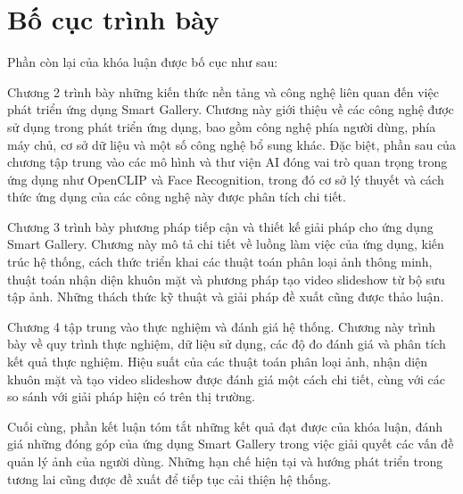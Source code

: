 \section{Bố cục trình bày}

Phần còn lại của khóa luận được bố cục như sau: 

Chương 2 trình bày những kiến thức nền tảng và công nghệ liên quan đến việc phát triển ứng dụng Smart Gallery. Chương này giới thiệu về các công nghệ được sử dụng trong phát triển ứng dụng, bao gồm công nghệ phía người dùng, phía máy chủ, cơ sở dữ liệu và một số công nghệ bổ sung khác. Đặc biệt, phần sau của chương tập trung vào các mô hình và thư viện AI đóng vai trò quan trọng trong ứng dụng như OpenCLIP và Face Recognition, trong đó cơ sở lý thuyết và cách thức ứng dụng của các công nghệ này được phân tích chi tiết.

Chương 3 trình bày phương pháp tiếp cận và thiết kế giải pháp cho ứng dụng Smart Gallery. Chương này mô tả chi tiết về luồng làm việc của ứng dụng, kiến trúc hệ thống, cách thức triển khai các thuật toán phân loại ảnh thông minh, thuật toán nhận diện khuôn mặt và phương pháp tạo video slideshow từ bộ sưu tập ảnh. Những thách thức kỹ thuật và giải pháp đề xuất cũng được thảo luận.

Chương 4 tập trung vào thực nghiệm và đánh giá hệ thống. Chương này trình bày về quy trình thực nghiệm, dữ liệu sử dụng, các độ đo đánh giá và phân tích kết quả thực nghiệm. Hiệu suất của các thuật toán phân loại ảnh, nhận diện khuôn mặt và tạo video slideshow được đánh giá một cách chi tiết, cùng với các so sánh với giải pháp hiện có trên thị trường.

Cuối cùng, phần kết luận tóm tắt những kết quả đạt được của khóa luận, đánh giá những đóng góp của ứng dụng Smart Gallery trong việc giải quyết các vấn đề quản lý ảnh của người dùng. Những hạn chế hiện tại và hướng phát triển trong tương lai cũng được đề xuất để tiếp tục cải thiện hệ thống.
